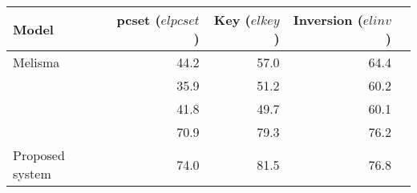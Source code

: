 \begin{tabular}{l|rrrr}
Model                        & \gls{pcset} ($elpcset$) & Key ($elkey$) & Inversion ($elinv$) \\
\hline                       
Melisma                      & 44.2                    & 57.0          & 64.4                \\
\textcite{mcleod2021modular} & 35.9                    & 51.2          & 60.2                \\
\textcite{chen2021attend}    & 41.8                    & 49.7          & 60.1                \\
\textcite{micchi2021deep}    & 70.9                    & 79.3          & 76.2                \\
Proposed system              & 74.0                    & 81.5          & 76.8   
\end{tabular}

               

